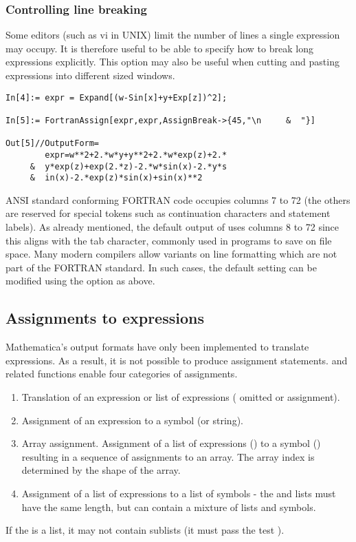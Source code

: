 \documentclass [12pt,twoside]{article}
\begin{document}
\subsubsection{Controlling line breaking}

Some editors (such as vi in UNIX) limit the number of lines a single
expression may occupy. It is therefore useful to be able to specify how
to break long expressions explicitly. This option may also be useful
when cutting and pasting expressions into different sized windows.

\begin{verbatim}
In[4]:= expr = Expand[(w-Sin[x]+y+Exp[z])^2];

In[5]:= FortranAssign[expr,expr,AssignBreak->{45,"\n     &  "}]

Out[5]//OutputForm=
        expr=w**2+2.*w*y+y**2+2.*w*exp(z)+2.*
     &  y*exp(z)+exp(2.*z)-2.*w*sin(x)-2.*y*s
     &  in(x)-2.*exp(z)*sin(x)+sin(x)**2
\end{verbatim}
ANSI standard conforming FORTRAN code occupies columns 7 to 72 (the others are reserved
for special tokens such as continuation characters and statement
labels). As already mentioned, the default output of  uses
columns 8 to 72 since this aligns with the tab character, commonly used in
programs to save on file space. Many modern compilers allow variants on line
formatting which are not part of the FORTRAN standard. In such cases, the default
setting can be modified using the  option as above.

\pagebreak[2]

\subsection{Assignments to expressions}

Mathematica's output formats have only been implemented to translate
expressions. As a result, it is not possible to produce assignment statements.
 and related functions enable four categories of assignments.
\begin{enumerate}
\item Translation of an expression or list of expressions ( omitted or
 assignment).
\item Assignment of an expression to a symbol (or string).
\item Array assignment. Assignment of a list of expressions () to a symbol
() resulting in a sequence of assignments to an array. The array index is
determined by the shape of the array.
\item Assignment of a list of expressions to a list of symbols - the
 and  lists must have the same length, but can contain a
mixture of lists and symbols.
\end{enumerate}
If the  is a list, it may not contain sublists (it must pass the test
).
\end{document}
